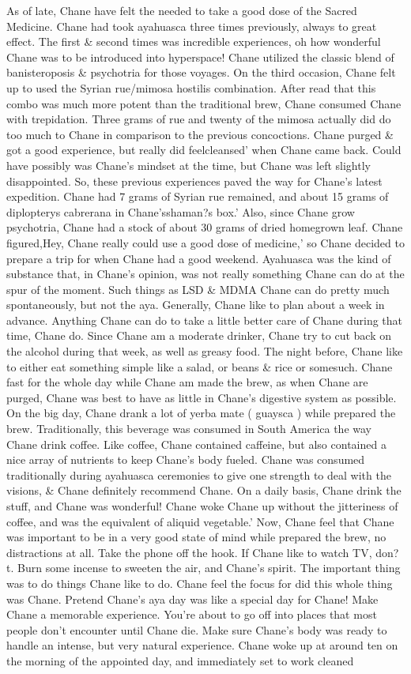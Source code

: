 \documentclass[12pt]{book}
\begin{document}
As of late, Chane have felt the needed to take a good dose of the Sacred Medicine. Chane had took ayahuasca three times previously, always to great effect. The first \& second times was incredible experiences, oh how wonderful Chane was to be introduced into hyperspace! Chane utilized the classic blend of banisteroposis \& psychotria for those voyages. On the third occasion, Chane felt up to used the Syrian rue/mimosa hostilis combination. After read that this combo was much more potent than the traditional brew, Chane consumed Chane with trepidation. Three grams of rue and twenty of the mimosa actually did do too much to Chane in comparison to the previous concoctions. Chane purged \& got a good experience, but really did feelcleansed' when Chane came back. Could have possibly was Chane's mindset at the time, but Chane was left slightly disappointed. So, these previous experiences paved the way for Chane's latest expedition. Chane had 7 grams of Syrian rue remained, and about 15 grams of diplopterys cabrerana in Chane'sshaman?s box.' Also, since Chane grow psychotria, Chane had a stock of about 30 grams of dried homegrown leaf. Chane figured,Hey, Chane really could use a good dose of medicine,' so Chane decided to prepare a trip for when Chane had a good weekend. Ayahuasca was the kind of substance that, in Chane's opinion, was not really something Chane can do at the spur of the moment. Such things as LSD \& MDMA Chane can do pretty much spontaneously, but not the aya. Generally, Chane like to plan about a week in advance. Anything Chane can do to take a little better care of Chane during that time, Chane do. Since Chane am a moderate drinker, Chane try to cut back on the alcohol during that week, as well as greasy food. The night before, Chane like to either eat something simple like a salad, or beans \& rice or somesuch. Chane fast for the whole day while Chane am made the brew, as when Chane are purged, Chane was best to have as little in Chane's digestive system as possible. On the big day, Chane drank a lot of yerba mate ( guaysca ) while prepared the brew. Traditionally, this beverage was consumed in South America the way Chane drink coffee. Like coffee, Chane contained caffeine, but also contained a nice array of nutrients to keep Chane's body fueled. Chane was consumed traditionally during ayahuasca ceremonies to give one strength to deal with the visions, \& Chane definitely recommend Chane. On a daily basis, Chane drink the stuff, and Chane was wonderful! Chane woke Chane up without the jitteriness of coffee, and was the equivalent of aliquid vegetable.' Now, Chane feel that Chane was important to be in a very good state of mind while prepared the brew, no distractions at all. Take the phone off the hook. If Chane like to watch TV, don?t. Burn some incense to sweeten the air, and Chane's spirit. The important thing was to do things Chane like to do. Chane feel the focus for did this whole thing was Chane. Pretend Chane's aya day was like a special day for Chane! Make Chane a memorable experience. You're about to go off into places that most people don't encounter until Chane die. Make sure Chane's body was ready to handle an intense, but very natural experience. Chane woke up at around ten on the morning of the appointed day, and immediately set to work cleaned 
\end{document}
